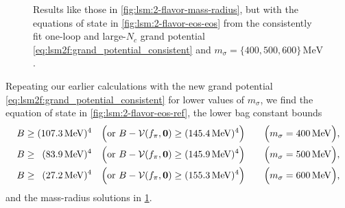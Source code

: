 \begin{figure}[t]
\caption{\label{fig:lsm:2-flavor-mass-radius-ref}%
Results like those in \cref{fig:lsm:2-flavor-mass-radius},
but with the equations of state in \cref{fig:lsm:2-flavor-eos-eos} from the consistently fit one-loop and large-$N_c$ grand potential \eqref{eq:lsm2f:grand_potential_consistent}
and $m_\sigma = \{400,500,600\} \, \si{\mega\electronvolt}$.
}
\end{figure}

Repeating our earlier calculations with the new grand potential \eqref{eq:lsm2f:grand_potential_consistent} for lower values of $m_\sigma$,
we find the equation of state in \cref{fig:lsm:2-flavor-eos-ref},
the lower bag constant bounds
\begin{subequations}
\begin{align}
	B \geq (\SI{107.3}{\mega\electronvolt})^4           \quad \Big(\text{or } B-\mathcal{V}(f_\pi,{\bm{0}}) \geq (\SI{145.4}{\mega\electronvolt})^4\Big) \qquad \Big(m_\sigma = \SI{400}{\mega\electronvolt}\Big), \\
	B \geq \phantom{0}(\SI{83.9}{\mega\electronvolt})^4 \quad \Big(\text{or } B-\mathcal{V}(f_\pi,{\bm{0}}) \geq (\SI{145.9}{\mega\electronvolt})^4\Big) \qquad \Big(m_\sigma = \SI{500}{\mega\electronvolt}\Big), \\
	B \geq \phantom{0}(\SI{27.2}{\mega\electronvolt})^4  \quad \Big(\text{or } B-\mathcal{V}(f_\pi,{\bm{0}}) \geq (\SI{155.3}{\mega\electronvolt})^4\Big) \qquad \Big(m_\sigma = \SI{600}{\mega\electronvolt}\Big),
\end{align}%
\label{eq:lsm:bag_lower_bound_ref}%
\end{subequations}
and the mass-radius solutions in \cref{fig:lsm:2-flavor-mass-radius-ref}.

